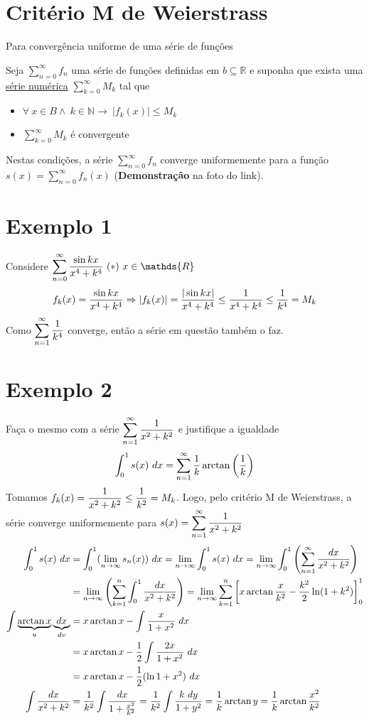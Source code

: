 \documentclass[12pt,openany, letterpaper]{book}
\newcommand{\LI}[1][n]{\lim_{{#1} \rightarrow \infty}}
\newcommand{\soma}[2][n]{\sum_{{#1} = #2}^\infty}
\begin{document}
\section{Critério M de Weierstrass} {Para convergência uniforme de uma série de funções}

Seja $\displaystyle{\soma{0} f_n}$ uma série de funções definidas em $b \subseteq \mathds{R}$ e suponha que exista uma \underline{série numérica} $\displaystyle{\soma[k]{0} M_k}$ tal que \begin{itemize}
\item $\forall \ x \in B \land \ k \in \mathds{N} \rightarrow \ |f_k(x)| \leq M_k$
\item $\displaystyle{\soma[k]{0} M_k}$ é convergente
\end{itemize}

Nestas condições, a série $\displaystyle{\soma{0} f_n}$ converge uniformemente para a função $\displaystyle{s(x) = \soma{0} f_n(x)}$ (\textbf{Demonstração} na foto do link).

\section*{Exemplo 1} {Considere $\displaystyle{\soma{0} {\sin kx \over x^4 + k^4} \ (*) \ x \in \mathds{R}}$}
$$f_k(x) = {\sin kx \over x^4 + k^4} \Rightarrow |f_k(x)| = {|\sin kx| \over x^4 + k^4} \leq {1 \over x^4 + k^4} \leq {1 \over k^4} = M_k$$ Como $\displaystyle{\soma{1} {1 \over k^4}}$ converge, então a série em questão também o faz.

\section*{Exemplo 2}{Faça o mesmo com a série $\displaystyle{\soma{1} {1 \over x^2 + k^2}}$ e justifique a igualdade $$\int_0^1 s(x) \ dx = \soma{1} {1 \over k} \arctan \left( {1 \over k} \right)$$} Tomamos $\displaystyle{f_k(x) = {1 \over x^2 + k^2} \leq {1 \over k^2} = M_k}$. Logo, pelo critério M de Weierstrass, a série converge uniformemente para $s(x) = \displaystyle{\soma{1} {1 \over x^2 + k^2}}$ \begin{align*}
\int_0^1 s(x) \ dx &= \int_0^1 (\LI s_n (x)) \ dx = \LI \int_0^1 s(x) \ dx = \LI \int_0^1 \left(\soma{1} {dx \over x^2 + k^2}\right) \\
&= \LI \left( \sum_{k=1}^n \int_0^1 {dx \over x^2 + k^2}\right) = \LI \sum_{k=1}^n \left[ x \arctan {x \over k^2} - {k^2 \over 2} \ln (1+k^2) \right]_0^1\\
\int \underbrace{\arctan x}_{u} \underbrace{dx}_{dv} &= x \arctan x - \int {x \over 1 + x^2} \ dx \\
&= x \arctan x - {1 \over 2} \int {2x \over 1 + x^2} \ dx \\
&= x \arctan x - {1 \over 2} (\ln{1 + x^2}) \ dx \\
\int {dx \over x^2 + k^2} &= {1 \over k^2} \int \frac{dx}{1 + \frac{x^2}{k^2}} = {1 \over k^2} \int \frac{k \ dy}{1 + y^2} = \frac{1}{k} \arctan{y} = \frac{1}{k} \arctan{\frac{x^2}{k^2}}
\end{align*}
\end{document}
